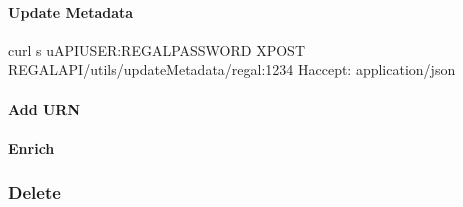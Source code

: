 \documentclass[letterpaper,10pt,english]{sphinxmanual}
\begin{document}
\paragraph{Update Metadata}
\label{\detokenize{api-toscience:update-metadata}}\label{\detokenize{api-toscience:id19}}
\begin{sphinxVerbatim}[commandchars=\\\{\}]
curl \PYGZhy{}s \PYGZhy{}u\PYGZdl{}API\PYGZus{}USER:\PYGZdl{}REGAL\PYGZus{}PASSWORD \PYGZhy{}XPOST \PYGZdl{}REGAL\PYGZus{}API/utils/updateMetadata/regal:1234 \PYGZhy{}H\PYGZdq{}accept: application/json\PYGZdq{}
\end{sphinxVerbatim}


\paragraph{Add URN}
\label{\detokenize{api-toscience:add-urn}}\label{\detokenize{api-toscience:id20}}
\begin{sphinxVerbatim}[commandchars=\\\{\}]
 
\end{sphinxVerbatim}

\begin{sphinxVerbatim}[commandchars=\\\{\}]
 
\end{sphinxVerbatim}

\begin{sphinxVerbatim}[commandchars=\\\{\}]
 
\end{sphinxVerbatim}


\paragraph{Enrich}
\label{\detokenize{api-toscience:enrich}}\label{\detokenize{api-toscience:id21}}
\begin{sphinxVerbatim}[commandchars=\\\{\}]
 
\end{sphinxVerbatim}


\subsubsection{Delete}
\label{\detokenize{api-toscience:delete}}\label{\detokenize{api-toscience:id22}}
\end{document}
